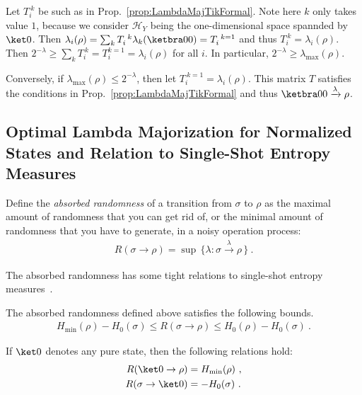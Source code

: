 \documentclass[12pt,a4paper]{article}
\def\Hs{\mathscr{H}}%
\def\HH{{H}}%
\def\Hmin{\HH_\mathrm{min}}
\def\Hzero{\HH_0}
\newenvironment{myproof}[1][\proofname]{%
  \color{prooftextcolor} \footnotesize \proof[\itshape #1]\hspace*{1.2mm}%
}{\endproof}
\newcommand{\lambdamaj}[1]{\xrightarrow{#1}}
\begin{document}
\begin{myproof}[Proof of Prop.~\ref{prop:LambdaMajorizedDOpsByPureState}]
  Let $T_i^{~k}$ be such as in Prop.~\ref{prop:LambdaMajTikFormal}. Note here $k$ only takes value
  $1$, because we consider $\Hs_Y$ being the one-dimensional space spannded by $\ket0$. Then
  $\lambda_i(\rho) = \sum_k T_i^{~k} \lambda_k(\ketbra00) = T_i^{~k=1}$ and thus
  $T_i^{~k}=\lambda_i(\rho)$. Then $2^{-\lambda} \geqslant \sum_k T_i^{~k} = T_i^{k=1} = \lambda_i(\rho)$ for
  all $i$. In particular, $2^{-\lambda}\geqslant \lambda_\mathrm{max}(\rho)$.

  Conversely, if $\lambda_\mathrm{max}(\rho) \leqslant 2^{-\lambda}$, then let $T_i^{~k=1}=\lambda_i(\rho)$. This
  matrix $T$ satisfies the conditions in Prop.~\ref{prop:LambdaMajTikFormal} and thus
  $\ketbra00\lambdamaj\lambda\rho$.
\end{myproof}


\subsection{Optimal Lambda Majorization for Normalized States and Relation to Single-Shot Entropy Measures}

Define the {\em absorbed randomness} of a transition from $\sigma$ to $\rho$ as the maximal amount of randomness
that you can get rid of, or the minimal amount of randomness that you have to generate, in a noisy operation
process:
\begin{align}
  \label{eq:AbsorbedRandomnessDef}
  R(\sigma\rightarrow\rho) = \sup\, \bigl\{ \lambda : \sigma \lambdamaj{\lambda} \rho \, \bigr\}\ .
\end{align}

The absorbed randomness has some tight relations to single-shot entropy measures~\cite{PhdRenner2005_SQKD}.

\begin{prop}
  \label{prop:RBoundsHminmax}
  The absorbed randomness defined above satisfies the following bounds.
  \begin{align*}
    \Hmin(\rho)-\Hzero(\sigma) \leqslant R(\sigma\rightarrow\rho) \leqslant \Hzero(\rho) - \Hzero(\sigma) \ .
  \end{align*}
\end{prop}

\begin{prop}
  \label{prop:RpurerhoAndRsigmapure}
  If $\ket0$ denotes any pure state, then the following relations hold:
  \begin{align}
    \label{eq:Rpurerho}  R(\ket 0 \rightarrow \rho) &= \Hmin(\rho)\ ,\\
    \label{eq:Rsigmapure}  R(\sigma \rightarrow \ket 0) &= -\Hzero(\sigma)\ .
  \end{align}
\end{prop}
\end{document}
